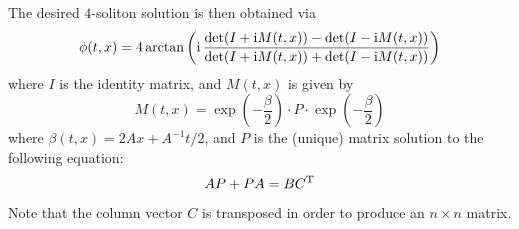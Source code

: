 \documentclass{report}
\def\ii{{\rm i}}
\begin{document}
The desired $4$-soliton solution is then obtained via
\begin{equation}
  \phi(t,x) = 4\arctan \left(\ii\,\frac{\det(I + \ii M(t,x))-\det(I - \ii M(t,x))}{\det(I + \ii M(t,x))+\det(I - \ii M(t,x))}\right)
\end{equation}
where $I$ is the identity matrix, and $M(t,x)$ is given by
\begin{equation}
  M(t,x) = \exp\left(-\frac{\beta}{2}\right)\cdot P \cdot \exp\left(-\frac{\beta}{2}\right)
\end{equation}
where $\beta(t,x) = 2Ax+A^{-1}t/2$, and $P$ is the (unique) matrix solution to the following equation:
\begin{equation}
  AP + PA = B C^{\rm T}
\end{equation}
Note that the column vector $C$ is transposed in order to produce an $n\times n$ matrix.

\medbreak
\end{document}
